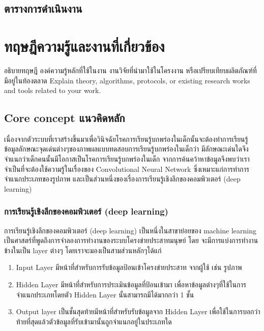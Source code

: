 \documentclass[12pt,oneside,openright,a4paper]{cpe-thai-project}
\begin{document}
\section{ตารางการดำเนินงาน}

\chapter{ทฤษฎีความรู้และงานที่เกี่ยวข้อง}

อธิบายทฤษฎี องค์ความรู้หลักที่ใช้ในงาน งานวิจัยที่นำมาใช้ในโครงงาน หรือเปรียบเทียบผลิตภัณฑ์ที่มีอยู่ในท้องตลาด
Explain theory, algorithms, protocols, or existing research works and tools related to your work. 

\section{Core concept แนวคิดหลัก}
เนื่องจากตัวระบบที่เราสร้างขึ้นมาเพื่อวินิจฉัยโรคการเรียนรู้บกพร่องในเด็กนั้นจะต้องทำการเรียนรู้ข้อมูลลักษณะจุดเด่นต่างๆของภาพผลแบบทดสอบการเรียนรู้บกพร่องในเด็กว่า 
มีลักษณะเด่นใดจึงจำแนกว่าเด็กคนนั้นมีโอกาสเป็นโรคการเรียนรู้บกพร่องในเด็ก 
จากการค้นคว้าหาข้อมูลจึงพบว่าเราจำเป็นที่จะต้องใช้ความรู้ในเรื่องของ Convolutional Neural Network 
ซึ่งเหมาะแก่การทำการจำแนกประเภทของรูปภาพ และเป็นส่วนหนึ่งของเรื่องการเรียนรู้เชิงลึกของคอมพิวเตอร์ (deep learning)

\subsection{การเรียนรู้เชิงลึกของคอมพิวเตอร์ (deep learning)}

\par การเรียนรู้เชิงลึกของคอมพิวเตอร์ (deep learning) เป็นหนึ่งในสาขาย่อยของ machine learning เป็นศาสตร์ที่พูดถึงการจำลองการทำงานของระบบโครงข่ายประสาทมนุษย์ โดย จะมีการแบ่งการทำงานข้างในเป็น layer ต่างๆ โดยเราจะมองเป็นสามส่วนหลักๆได้แก่ 	

\begin{enumerate}
  \item Input Layer มีหน้าที่สำหรับการรับข้อมูลป้อนเข้าโครงข่ายประสาท จากผู้ใช้ เช่น รูปภาพ
  \item Hidden Layer มีหน้าที่สำหรับการประเมินข้อมูลที่ป้อนเข้ามา เพื่อหาข้อมูลต่างๆที่ใช้ในการจำแนกประเภทโดยตัว Hidden Layer นั้นสามารถมีได้มากกว่า 1 ชั้น
  \item Output layer เป็นชั้นสุดท้ายมีหน้าที่สำหรับรับข้อมูลจาก Hidden Layer เพื่อใช้ในการบอกว่าท้ายที่สุดแล้วตัวข้อมูลที่รับเข้ามานั้นถูกจำแนกอยู่ในประเภทใด
\end{enumerate}
\end{document}
